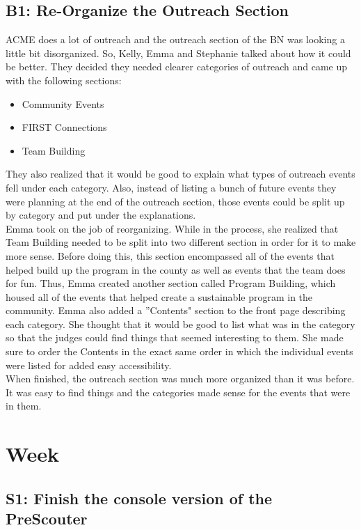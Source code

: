 \documentclass{article}
\begin{document}
\subsection{B1: Re-Organize the Outreach Section}

ACME does a lot of outreach and the outreach section of the BN was looking a little bit disorganized. So, Kelly, Emma and Stephanie talked about how it could be better. They decided they needed clearer categories of outreach and came up with the following sections: 

\begin{itemize}
    \item Community Events
    \item FIRST Connections
    \item Team Building
\end{itemize}

They also realized that it would be good to explain what types of outreach events fell under each category. Also, instead of listing a bunch of future events they were planning at the end of the outreach section, those events could be split up by category and put under the explanations. \\

Emma took on the job of reorganizing. While in the process, she realized that Team Building needed to be split into two different section in order for it to make more sense. Before doing this, this section encompassed all of the events that helped build up the program in the county as well as events that the team does for fun. Thus, Emma created another section called Program Building, which housed all of the events that helped create a sustainable program in the community. Emma also added a ''Contents" section to the front page describing each category. She thought that it would be good to list what was in the category so that the judges could find things that seemed interesting to them. She made sure to order the Contents in the exact same order in which the individual events were listed for added easy accessibility. \\

When finished, the outreach section was much more organized than it was before. It was easy to find things and the categories made sense for the events that were in them. 
\clearpage \newpage \section{Week \thesection} 
\subsection{S1: Finish the console version of the PreScouter}
\end{document}
